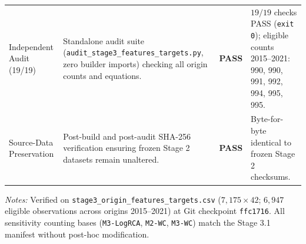 \begin{table}[htbp]
\begin{tabular}{>{\raggedright\arraybackslash}p{2.45cm} >{\raggedright\arraybackslash}p{4.85cm} c >{\raggedright\arraybackslash}p{5.15cm}}
\addlinespace[3pt]
Independent Audit (19/19) & Standalone audit suite (\texttt{audit\_stage3\_features\_targets.py}, zero builder imports) checking all origin counts and equations. & \textbf{PASS} & $19 / 19$ checks PASS (\texttt{exit 0}); eligible counts 2015--2021: 990, 990, 991, 992, 994, 995, 995. \\
\addlinespace[3pt]
Source-Data Preservation & Post-build and post-audit SHA-256 verification ensuring frozen Stage 2 datasets remain unaltered. & \textbf{PASS} & Byte-for-byte identical to frozen Stage 2 checksums. \\
\bottomrule
\end{tabular}

\vspace{4pt}
\parbox{14.8cm}{\scriptsize \textit{Notes:} Verified on \texttt{stage3\_origin\_features\_targets.csv} ($7{,}175 \times 42$; $6{,}947$ eligible observations across origins 2015--2021) at Git checkpoint \texttt{ffc1716}. All sensitivity counting bases (\texttt{M3-LogRCA}, \texttt{M2-WC}, \texttt{M3-WC}) match the Stage 3.1 manifest without post-hoc modification.}
\end{table}
